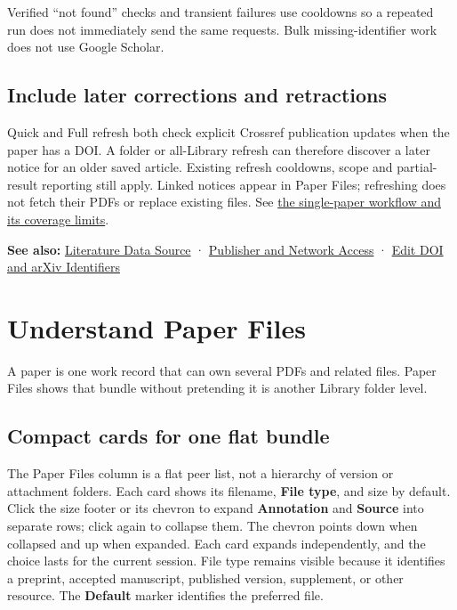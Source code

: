 \documentclass[10pt,letterpaper,oneside]{scrreprt}
\newenvironment{GewuRelated}{\par\nobreak\vspace{3pt}\nobreak\begingroup\small\sffamily\begin{samepage}\noindent}{\par\end{samepage}\endgroup}
\newenvironment{GewuLead}
  {\begin{list}{}{\leftmargin=0pt\rightmargin=0pt\topsep=0pt\partopsep=0pt\parsep=0pt}\item\relax
    \sffamily\fontsize{10.5}{13.2}\selectfont\color{GewuMuted}}
  {\end{list}}
\begin{document}
Verified ``not found'' checks and transient failures use cooldowns so a repeated run does not immediately send the same requests. Bulk missing-identifier work does not use Google Scholar.

\subsection{Include later corrections and retractions}\label{include-later-corrections-and-retractions}

Quick and Full refresh both check explicit Crossref publication updates when the paper has a DOI. A folder or all-Library refresh can therefore discover a later notice for an older saved article. Existing refresh cooldowns, scope and partial-result reporting still apply. Linked notices appear in Paper Files; refreshing does not fetch their PDFs or replace existing files. See \hyperref[paper-publication-updates]{the single-paper workflow and its coverage limits}.

\begin{GewuRelated}
\textbf{See also:} \hyperref[citation-settings]{Literature Data Source} · \hyperref[network-access]{Publisher and Network Access} · \hyperref[identifiers]{Edit DOI and arXiv Identifiers}
\end{GewuRelated}

\section{Understand Paper Files}\label{paper-files}

\begin{GewuLead}
A paper is one work record that can own several PDFs and related files. Paper Files shows that bundle without pretending it is another Library folder level.
\end{GewuLead}

\subsection{Compact cards for one flat bundle}\label{compact-cards-for-one-flat-bundle}

The Paper Files column is a flat peer list, not a hierarchy of version or attachment folders. Each card shows its filename, \textbf{File type}, and size by default. Click the size footer or its chevron to expand \textbf{Annotation} and \textbf{Source} into separate rows; click again to collapse them. The chevron points down when collapsed and up when expanded. Each card expands independently, and the choice lasts for the current session. File type remains visible because it identifies a preprint, accepted manuscript, published version, supplement, or other resource. The \textbf{Default} marker identifies the preferred file.
\end{document}
